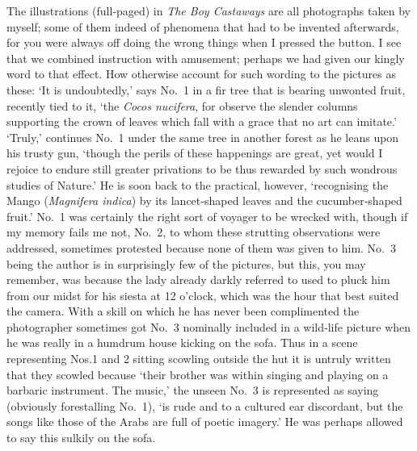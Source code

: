 The illustrations (full‐paged) in \emph{The Boy Castaways} are all photographs taken by myself;
some of them indeed of phenomena that had to be invented afterwards,
for you were always off doing the wrong things when I pressed the button.
I see that we combined instruction with amusement;
perhaps we had given our kingly word to that effect.
How otherwise account for such wording to the pictures as these:
‘It is undoubtedly,’ says No.~1 in a fir tree that is bearing unwonted fruit, recently tied to it,
‘the \emph{Cocos nucifera},
for observe the slender columns supporting the crown of leaves which fall
with a grace that no art can imitate.’
‘Truly,’ continues No.~1 under the same tree in another forest as he leans upon his trusty gun,
‘though the perils of these happenings are great,
yet would I rejoice to endure still greater privations
to be thus rewarded by such wondrous studies of Nature.’
He is soon back to the practical, however,
‘recognising the Mango (\emph{Magnifera indica})
by its lancet‐shaped leaves and the cucumber‐shaped fruit.’
No.~1 was certainly the right sort of voyager to be wrecked with,
though if my memory fails me not, No.~2, to whom these strutting observations were addressed,
sometimes protested because none of them was given to him.
No.~3 being the author is in surprisingly few of the pictures,
but this, you may remember, was because the lady already darkly referred to
used to pluck him from our midst for his siesta at 12 o’clock,
which was the hour that best suited the camera.
With a skill on which he has never been complimented
the photographer sometimes got No.~3 nominally included in a wild‐life picture
when he was really in a humdrum house kicking on the sofa.
Thus in a scene representing Nos.\@ 1 and 2 sitting scowling outside the hut
it is untruly written that they scowled because
‘their brother was within singing and playing on a barbaric instrument.
The music,’ the unseen No.~3 is represented as saying (obviously forestalling No.~1),
‘is rude and to a cultured ear discordant,
but the songs like those of the Arabs are full of poetic imagery.’
He was perhaps allowed to say this sulkily on the sofa.

